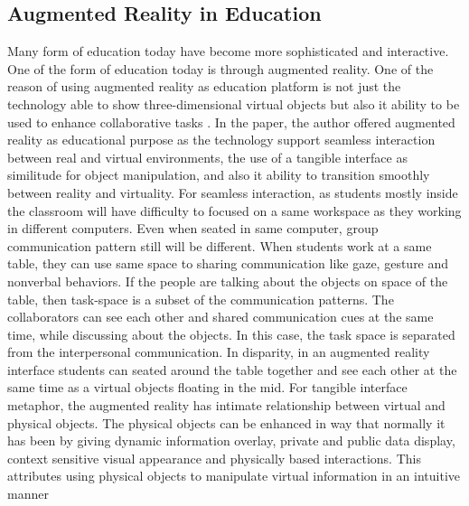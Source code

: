 \documentclass[12pt]{article}
\begin{document}
\subsection{Augmented Reality in Education}
Many form of education today have become more sophisticated and interactive. One of the form of education today is through augmented reality. One of the reason of using augmented reality as education platform is not just the technology able to show three-dimensional virtual objects but also it ability to be used to enhance collaborative tasks \cite{billinghurst2002augmented}. In the paper, the author offered augmented reality as educational purpose as the technology support seamless interaction between real and virtual environments, the use of a tangible interface as similitude for object manipulation, and also it ability to transition smoothly between reality and virtuality. For seamless interaction, as students mostly inside the classroom will have difficulty to focused on a same workspace as they working in different computers. Even when seated in same computer, group communication pattern still will be different. When students work at a same table, they can use same space to sharing communication like gaze, gesture and nonverbal behaviors. If the people are talking about the objects on space of the table, then task-space is a subset of the communication patterns. The collaborators can see each other and shared communication cues at the same time, while discussing about the objects. In this case, the task space is separated from the interpersonal communication. In disparity, in an augmented reality interface students can seated around the table together and see each other at the same time as a virtual objects floating in the mid.
\newline
For tangible interface metaphor, the augmented reality has intimate relationship between virtual and physical objects. The physical objects can be enhanced in way that normally it has been by giving dynamic information overlay, private and public data display, context sensitive visual appearance and physically based interactions. This attributes using physical objects to manipulate virtual information in an intuitive manner
\end{document}
